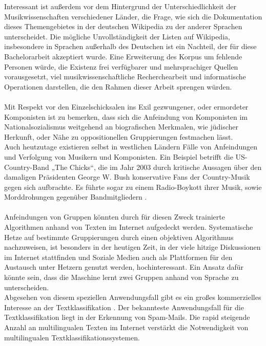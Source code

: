 \documentclass[ngerman]{ttlab-qualify}
\begin{document}
 Interessant ist außerdem vor dem Hintergrund der Unterschiedlichkeit der Musikwissenschaften verschiedener Länder, die Frage, wie sich die Dokumentation dieses Themengebietes in der deutschen Wikipedia zu der anderer Sprachen unterscheidet. Die mögliche Unvollständigkeit der Listen auf Wikipedia, insbesondere in Sprachen außerhalb des Deutschen ist ein Nachteil, der für diese Bachelorarbeit akzeptiert wurde. Eine Erweiterung des Korpus um fehlende Personen würde, die Existenz frei verfügbarer und mehrsprachiger Quellen vorausgesetzt, viel musikwissenschaftliche Recherchearbeit und informatische Operationen darstellen, die den Rahmen dieser Arbeit sprengen würden.\\
\\
Mit Respekt vor den Einzelschicksalen ins Exil gezwungener, oder ermordeter Komponisten ist zu bemerken, dass sich die Anfeindung von Komponisten im Nationalsozialismus weitgehend an biografischen Merkmalen, wie jüdischer Herkunft, oder Nähe zu oppositionellen Gruppierungen festmachen lässt.\\
Auch heutzutage existieren selbst in westlichen Ländern Fälle von Anfeindungen und Verfolgung von Musikern und Komponisten. Ein Beispiel betrifft die US-Country-Band „The Chicks“, die im Jahr 2003 durch kritische Aussagen über den damaligen Präsidenten George W. Bush konservative Fans der Country-Musik gegen sich aufbrachte. Es führte sogar zu einem Radio-Boykott ihrer Musik, sowie Morddrohungen gegenüber Bandmitgliedern \parencite{rösinger2007}.\\
\\
Anfeindungen von Gruppen könnten durch für diesen Zweck trainierte Algorithmen anhand von Texten im Internet aufgedeckt werden. Systematische Hetze auf bestimmte Gruppierungen durch einen objektiven Algorithmus nachzuweisen, ist besonders in der heutigen Zeit, in der viele hitzige Diskussionen im Internet stattfinden und Soziale Medien auch als Plattformen für den Austausch unter Hetzern genutzt werden, hochinteressant. Ein Ansatz dafür könnte sein, dass die Maschine lernt zwei Gruppen anhand von Sprache zu unterscheiden.\\ 
Abgesehen von diesem speziellen Anwendungsfall gibt es ein großes kommerzielles Interesse an der Textklassifikation \parencite{manning2008introduction}. Der bekannteste Anwendungsfall für die Textklassifikation liegt in der Erkennung von Spam-Mails. Die rapid steigende Anzahl an multilingualen Texten im Internet verstärkt die Notwendigkeit von multilingualen Textklassifikationssystemen.
\end{document}
